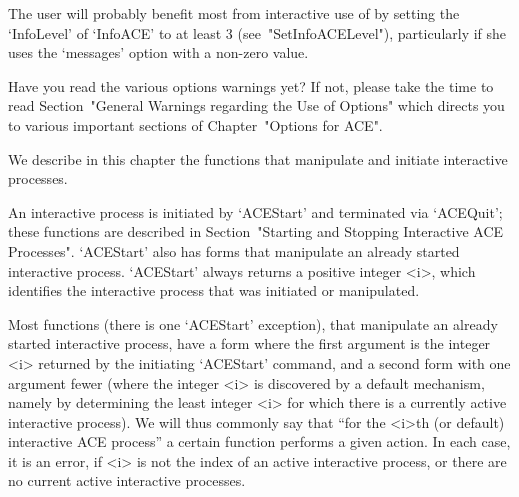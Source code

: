 

The user will probably benefit most from interactive use of {\ACE}  by
setting   the   `InfoLevel'   of   `InfoACE'    to    at    least    3
(see~"SetInfoACELevel"),  particularly  if  she  uses  the  `messages'
option with a non-zero value.

Have you read the various options warnings yet? If  not,  please  take
the time to  read  Section~"General  Warnings  regarding  the  Use  of
Options"  which  directs  you  to  various   important   sections   of
Chapter~"Options for ACE".

We describe in this chapter the functions that manipulate and initiate
interactive {\ACE} processes.

An  interactive  {\ACE}  process  is  initiated  by   `ACEStart'   and
terminated  via  `ACEQuit';   these   functions   are   described   in
Section~"Starting and Stopping Interactive ACE Processes".  `ACEStart'
also has forms that manipulate an already started  interactive  {\ACE}
process. `ACEStart' always  returns  a  positive  integer  <i>,  which
identifies the  interactive  {\ACE}  process  that  was  initiated  or
manipulated.

Most functions (there is one `ACEStart' exception), that manipulate an
already started interactive {\ACE} process,  have  a  form  where  the
first  argument  is  the  integer  <i>  returned  by  the   initiating
`ACEStart' command, and a second form with one argument  fewer  (where
the integer <i> is  discovered  by  a  default  mechanism,  namely  by
determining the least integer <i>  for  which  there  is  a  currently
active interactive {\ACE} process). We will  thus  commonly  say  that
``for the <i>th (or default) interactive  {ACE}  process''  a  certain
function performs a given action. In each case, it is an error, if <i>
is not the index of an active interactive process,  or  there  are  no
current active interactive processes.

